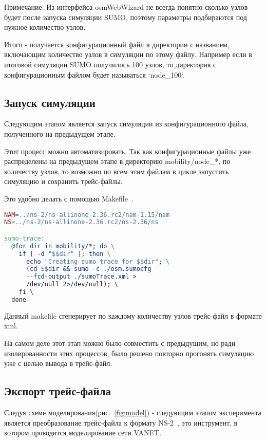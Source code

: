 Примечание: Из интерфейса osmWebWizard не всегда понятно сколько узлов будет после запуска симуляции SUMO, поэтому параметры подбираются под нужное количество узлов.

Итого - получается конфигурационный файл в директории с названием, включающим количество узлов в симуляции по этому файлу. Например если в итоговой симуляции SUMO получилось 100 узлов, то директория с конфигурационным файлом будет называться `node\_100`.

\subsection*{Запуск симуляции}

Следующим этапом является запуск симуляции из конфигурационного файла, полученного на предыдущем этапе. 

Этот процесс можно автоматизировать. Так как конфигурационные файлы уже распределены на предыдущем этапе в директорию mobility/node\_*, по количеству узлов, то возможно по всем этим файлам в цикле запустить симуляцию и сохранить трейс-файлы.

Это удобно делать с помощью Makefile~\cite{makefile}.

\begin{lstlisting}[language=make, style=mystyle, caption=Makefile для запуска симуляции мобильности]
NAM=../ns-2/ns-allinone-2.36.rc2/nam-1.15/nam
NS=../ns-2/ns-allinone-2.36.rc2/ns-2.36/ns

sumo-trace:
  @for dir in mobility/*; do \
    if [ -d "$$dir" ]; then \
      echo "Creating sumo trace for $$dir"; \
      (cd $$dir && sumo -c ./osm.sumocfg  
      --fcd-output ./sumoTrace.xml > 
      /dev/null 2>/dev/null); \
    fi \
  done

\end{lstlisting}

Данный makefile сгенерирует по каждому количеству узлов трейс-файл в формате xml.

На самом деле этот этап можно было совместить с предыдущим, но ради изолированности этих процессов, было решено повторно прогонять симуляцию уже с целью вывода в трейс-файл.

\subsection*{Экспорт трейс-файла}

Следуя схеме моделирования(рис.~\ref{fig:model}) - следующим этапом эксперимента является преобразование трейс-файла к формату NS-2~\cite{ns2_docs}, это инструмент, в котором проводится моделирование сети VANET.


